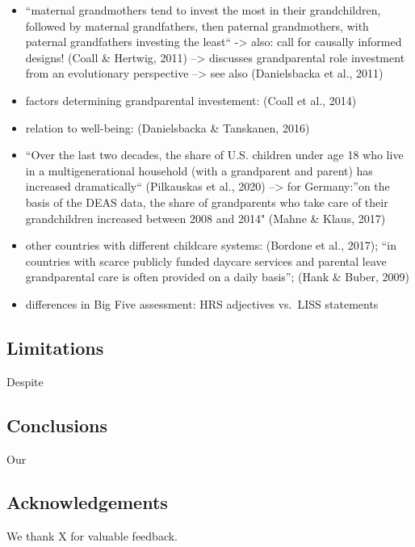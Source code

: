 \documentclass[
  english,
  man, noextraspace]{apa7}
\begin{document}
\begin{itemize}
\item
  ``maternal grandmothers tend to invest the most in their grandchildren, followed by maternal grandfathers, then paternal grandmothers, with paternal grandfathers investing the least`` -\textgreater{} also: call for causally informed designs! (Coall \& Hertwig, 2011) --\textgreater{} discusses grandparental role investment from an evolutionary perspective --\textgreater{} see also (Danielsbacka et al., 2011)
\item
  factors determining grandparental investement: (Coall et al., 2014)
\item
  relation to well-being: (Danielsbacka \& Tanskanen, 2016)
\item
  \enquote{Over the last two decades, the share of U.S. children under age 18 who live in a multigenerational household (with a grandparent and parent) has increased dramatically`` (Pilkauskas et al., 2020) --\textgreater{} for Germany:}on the basis of the DEAS data, the share of grandparents who take care of their grandchildren increased between 2008 and 2014" (Mahne \& Klaus, 2017)
\item
  other countries with different childcare systems: (Bordone et al., 2017); \enquote{in countries with scarce publicly funded daycare services and parental leave grandparental care is often provided on a daily basis}; (Hank \& Buber, 2009)
\item
  differences in Big Five assessment: HRS adjectives vs.~LISS statements
\end{itemize}

\hypertarget{limitations}{%
\subsection{Limitations}\label{limitations}}

Despite

\hypertarget{conclusions}{%
\subsection{Conclusions}\label{conclusions}}

Our

\hypertarget{acknowledgements}{%
\subsection{Acknowledgements}\label{acknowledgements}}

We thank X for valuable feedback.
\end{document}
